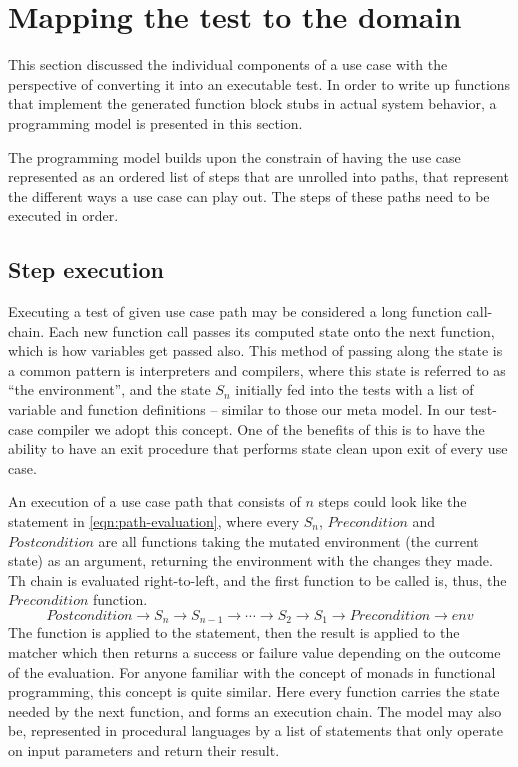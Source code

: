 \section{Mapping the test to the domain}
This section discussed the individual components of a use case with the perspective of converting it into an executable test. In order to write up functions that implement the generated function block stubs in actual system behavior, a programming model is presented in this section.\medskip

\noindent The programming model builds upon the constrain of having the use case represented as an ordered list of steps that are unrolled into paths, that represent the different ways a use case can play out. The steps of these paths need to be executed in order.
\subsection{Step execution}
\label{ssec:step-execution}
\label{sec:use-case-environment}
Executing a test of given use case path may be considered a long function call-chain. Each new function call passes its computed state onto the next function, which is how variables get passed also. This method of passing along the state is a common pattern is interpreters and compilers, where this state is referred to as ``the environment'', and the state $S_n$ initially fed into the tests with a list of variable and function definitions -- similar to those our meta model. In our test-case compiler we adopt this concept. One of the benefits of this is to have the ability to have an exit procedure that performs state clean upon exit of every use case.\medskip

\noindent An execution of a use case path that consists of $n$ steps could look like the statement in \ref{eqn:path-evaluation}, where every $S_n$, $Precondition$ and $Postcondition$ are all functions taking the mutated environment (the current state) as an argument, returning the environment with the changes they made. Th chain is evaluated right-to-left, and the first function to be called is, thus, the $Precondition$ function.
\begin{equation}
Postcondition \rightarrow S_n \rightarrow S_{n-1} \rightarrow \dotsb \rightarrow S_2 \rightarrow S_1 \rightarrow Precondition \rightarrow env
\label{eqn:path-evaluation}
\end{equation}
The function is applied to the statement, then the result is applied to the matcher which then returns a success or failure value depending on the outcome of the evaluation. For anyone familiar with the concept of monads in functional programming, this concept is quite similar. Here every function carries the state needed by the next function, and forms an execution chain. The model may also be, represented in procedural languages by a list of statements that only operate on input parameters and return their result.\medskip

